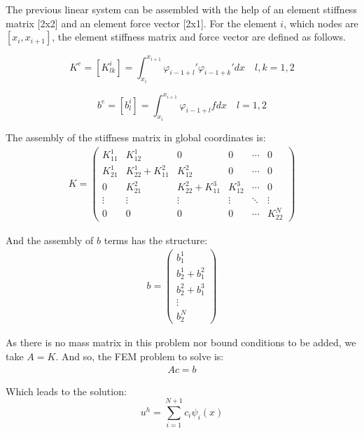 \documentclass{article}
\begin{document}
\noindent The previous linear system can be assembled with the help of an element stiffness matrix [2x2] and an element force vector [2x1]. For the element $i$, which nodes are $[x_i,x_{i+1}]$, the element stiffness matrix and force vector are defined as follows.

\begin{equation*}
    {K}^e=[K^i_{lk}]=\int_{x_i}^{x_{i+1}} \varphi_{i-1+l}' \varphi_{i-1+k}' dx \quad
     l,k=1,2  
\end{equation*}

\begin{equation*}
    b^e=[b^i_{l}]=\int_{x_i}^{x_{i+1}} \varphi_{i-1+l} f dx \quad
     l=1,2  
\end{equation*}

\noindent The assembly of the stiffness matrix in global coordinates is:
\begin{gather*}
    K=\begin{pmatrix}
        K_{11}^1 & K_{12}^1 & 0 & 0 & \cdots & 0\\
        K_{21}^1 & K_{22}^1+K_{11}^2 & K_{12}^2 & 0 & \cdots & 0\\ 
        0 & K_{21}^2 & K_{22}^2+K_{11}^3 & K_{12}^3 & \cdots & 0\\
        \vdots & \vdots & \vdots & \vdots & \ddots & \vdots\\
        0 & 0 & 0 & 0 & \cdots & K_{22}^N
    \end{pmatrix}
\end{gather*}

\noindent And the assembly of $b$ terms has the structure:
\begin{gather*}
    b=\begin{pmatrix}
        b_1^1\\b_2^1+b_1^2\\b_2^2+b_1^3\\ \vdots \\ b_2^N
    \end{pmatrix}
\end{gather*}

\noindent As there is no mass matrix in this problem nor bound conditions to be added, we take $A=K$. And so, the FEM problem to solve is:
\begin{gather*}
    Ac=b
\end{gather*}

\noindent Which leads to the solution:
\begin{equation*}
    u^h=\sum\limits_{i=1}^{N+1} c_i\psi_i(x)
\end{equation*}
\end{document}
